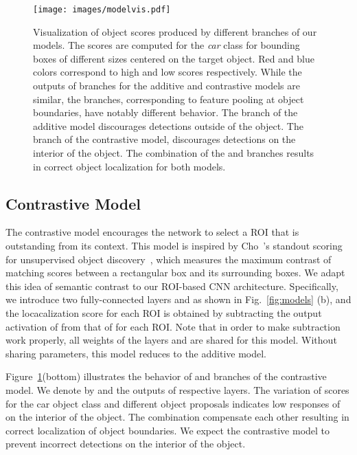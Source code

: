 \documentclass[runningheads]{llncs}
\begin{document}
\begin{figure}[t]
\centering
\texttt{[image: images/modelvis.pdf]}
\caption[small]{
Visualization of object scores produced by different branches of our models. The scores are computed
for the {\em car} class for bounding boxes of different sizes centered on the target object. Red and blue
colors correspond to high and low scores respectively. While the outputs of  branches for the
additive and contrastive models are similar, the  branches, corresponding to feature
pooling at object boundaries, have notably different behavior. The  branch of the additive model
discourages detections outside of the object. The  branch of the contrastive model, discourages
detections on the interior of the object. The combination of the  and  branches results in correct object
localization for both models.
}
\label{fig:modelvis}
\end{figure}

\subsection{Contrastive Model} \label{sec:contrastive}





The contrastive model encourages the network to select a ROI that is
outstanding from its context.  This model is inspired by Cho~\etal's
standout scoring for unsupervised object discovery~\cite{Cho:2015vz}, which
measures the maximum contrast of matching scores between a rectangular box and
its surrounding boxes. We adapt this idea of semantic contrast to our ROI-based
CNN architecture. Specifically, we introduce two fully-connected layers  and  as shown in Fig.~\ref{fig:models} (b), and the locacalization score for each ROI is obtained by subtracting the output activation of  from that of  for each ROI.
Note that in order to make subtraction work properly, all weights of the layers  and  are shared for this model. Without sharing parameters, this model reduces to the additive model.  

Figure~\ref{fig:modelvis}(bottom) illustrates the behavior of  and 
branches of the contrastive model. We denote by  and  the outputs of respective layers. The variation of scores for the car object
class and different object proposals indicates low responses of 
on the interior of the object. The combination  compensate each other
resulting in correct localization of object boundaries. We expect the
contrastive model to prevent incorrect detections on the interior of the object.
\end{document}
